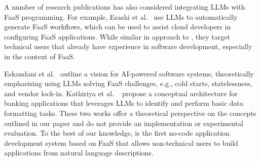 A number of research publications has also considered integrating LLMs with FaaS programming.
For example, Esashi et al.~\cite{esashi2024action} use LLMs to automatically generate FaaS workflows, which can be used to assist cloud developers in configuring FaaS applications.
While similar in approach to \sysname{}, they target technical users that already have experience in software development, especially in the context of FaaS.

Eskandani et al.~\cite{eskandani2024towards} outline a vision for AI-powered software systems, theoretically emphasizing using LLMs solving FaaS challenges, e.g., cold starts, statelessness, and vendor lock-in.
Kathiriya et al. ~\cite{kathiriyaserverless} propose a conceptual architecture for banking applications that leverages LLMs to identify and perform basic data formatting tasks.
These two works offer a theoretical perspective on the concepts outlined in our paper and do not provide an implementation or experimental evaluation.
To the best of our knowledge, \sysname{} is the first no-code application development system based on FaaS that allows non-technical users to build applications from natural language descriptions.
